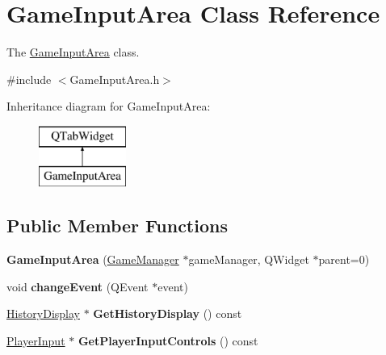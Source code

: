 \hypertarget{classGameInputArea}{\section{Game\-Input\-Area Class Reference}
\label{classGameInputArea}
}


The \hyperlink{classGameInputArea}{Game\-Input\-Area} class.  




{\ttfamily \#include $<$Game\-Input\-Area.\-h$>$}

Inheritance diagram for Game\-Input\-Area\-:\begin{figure}[H]
\begin{center}
\leavevmode
\includegraphics[height=2.000000cm]{classGameInputArea}
\end{center}
\end{figure}
\subsection*{Public Member Functions}
\begin{DoxyCompactItemize}
\item 
\hypertarget{classGameInputArea_a37bb000732d3b5e4f98923d4a753991e}{{\bfseries Game\-Input\-Area} (\hyperlink{classGameManager}{Game\-Manager} $\ast$game\-Manager, Q\-Widget $\ast$parent=0)}\label{classGameInputArea_a37bb000732d3b5e4f98923d4a753991e}

\item 
\hypertarget{classGameInputArea_aeda3377d2dd4b04fe530ef96b52162ea}{void {\bfseries change\-Event} (Q\-Event $\ast$event)}\label{classGameInputArea_aeda3377d2dd4b04fe530ef96b52162ea}

\item 
\hypertarget{classGameInputArea_a490df7daa012d358294f715bdb6addf6}{\hyperlink{classHistoryDisplay}{History\-Display} $\ast$ {\bfseries Get\-History\-Display} () const }\label{classGameInputArea_a490df7daa012d358294f715bdb6addf6}

\item 
\hypertarget{classGameInputArea_ad68c49dd0996e9661d84cd778ebcb4ef}{\hyperlink{classPlayerInput}{Player\-Input} $\ast$ {\bfseries Get\-Player\-Input\-Controls} () const }\label{classGameInputArea_ad68c49dd0996e9661d84cd778ebcb4ef}

\end{DoxyCompactItemize}


